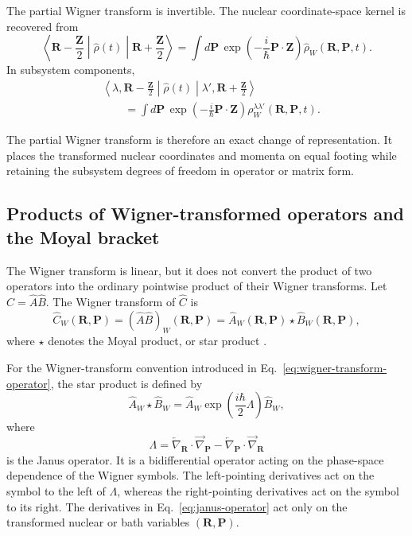 \documentclass[
  11pt,
  letterpaper,
  onehalfspacing,
  normalmargins,
  equalmargins,
  oneside
]{ut-thesis}
\begin{document}
The partial Wigner transform is invertible. The nuclear coordinate-space
kernel is recovered from
\begin{equation}
\left\langle
\mathbf R-\frac{\mathbf Z}{2}
\middle|
\hat\rho(t)
\middle|
\mathbf R+\frac{\mathbf Z}{2}
\right\rangle
=
\int d\mathbf P\,
\exp\left(
-\frac{i}{\hbar}\mathbf P\cdot\mathbf Z
\right)
\hat\rho_W(\mathbf R,\mathbf P,t).
\label{eq:inverse-wigner-transform-density}
\end{equation}
In subsystem components,
\begin{align}
&
\left\langle
\lambda,\mathbf R-\frac{\mathbf Z}{2}
\middle|
\hat\rho(t)
\middle|
\lambda',\mathbf R+\frac{\mathbf Z}{2}
\right\rangle
\nonumber\\
&\qquad =
\int d\mathbf P\,
\exp\left(
-\frac{i}{\hbar}\mathbf P\cdot\mathbf Z
\right)
\rho_W^{\lambda\lambda'}(\mathbf R,\mathbf P,t).
\label{eq:inverse-wigner-transform-density-components}
\end{align}

The partial Wigner transform is therefore an exact change of representation.
It places the transformed nuclear coordinates and momenta on equal footing
while retaining the subsystem degrees of freedom in operator or matrix form.


\subsection{Products of Wigner-transformed operators and the Moyal bracket}
\label{subsec:moyal-product-bracket}

The Wigner transform is linear, but it does not convert the product of two
operators into the ordinary pointwise product of their Wigner transforms. Let
\(\hat C=\hat A\hat B\). The Wigner transform of \(\hat C\) is
\begin{equation}
\hat C_W(\mathbf R,\mathbf P)
=
(\hat A\hat B)_W(\mathbf R,\mathbf P)
=
\hat A_W(\mathbf R,\mathbf P)
\star
\hat B_W(\mathbf R,\mathbf P),
\label{eq:wigner-product-star}
\end{equation}
where \(\star\) denotes the Moyal product, or star product
\cite{Wigner1932,Hillery1984,Case2008}.

For the Wigner-transform convention introduced in
Eq.~\eqref{eq:wigner-transform-operator}, the star product is defined by
\begin{equation}
\hat A_W\star\hat B_W
=
\hat A_W
\exp\left(
\frac{i\hbar}{2}\Lambda
\right)
\hat B_W,
\label{eq:star-product-definition}
\end{equation}
where
\begin{equation}
\Lambda
=
\overleftarrow{\nabla}_{\mathbf R}\cdot
\overrightarrow{\nabla}_{\mathbf P}
-
\overleftarrow{\nabla}_{\mathbf P}\cdot
\overrightarrow{\nabla}_{\mathbf R}
\label{eq:janus-operator}
\end{equation}
is the Janus operator. It is a bidifferential operator acting on the
phase-space dependence of the Wigner symbols. The left-pointing derivatives
act on the symbol to the left of \(\Lambda\), whereas the right-pointing
derivatives act on the symbol to its right. The derivatives in
Eq.~\eqref{eq:janus-operator} act only on the transformed nuclear or bath
variables \((\mathbf R,\mathbf P)\).
\end{document}
